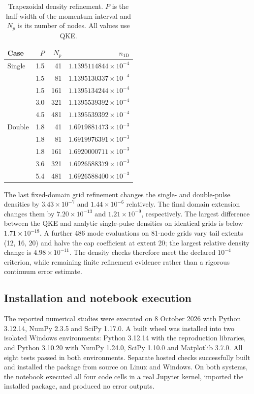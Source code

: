 \documentclass[a4paper,fleqn]{cas-dc}
\begin{document}
\begin{table}[pos=htbp]
\centering\small
\caption{Trapezoidal density refinement. $P$ is the half-width of the momentum interval and $N_p$ is its number of nodes. All values use QKE.}
\label{tab:density}
\begin{tabular}{lrrr}\toprule
Case & $P$ & $N_p$ & $n_{1\mathrm D}$\\\midrule
Single & 1.5 & 41 & $1.1395114844\times10^{-4}$\\
 & 1.5 & 81 & $1.1395130337\times10^{-4}$\\
 & 1.5 & 161 & $1.1395134244\times10^{-4}$\\
 & 3.0 & 321 & $1.1395539392\times10^{-4}$\\
 & 4.5 & 481 & $1.1395539392\times10^{-4}$\\
Double & 1.8 & 41 & $1.6919881473\times10^{-3}$\\
 & 1.8 & 81 & $1.6919976391\times10^{-3}$\\
 & 1.8 & 161 & $1.6920000711\times10^{-3}$\\
 & 3.6 & 321 & $1.6926588379\times10^{-3}$\\
 & 5.4 & 481 & $1.6926588400\times10^{-3}$\\
\bottomrule\end{tabular}
\end{table}

The last fixed-domain grid refinement changes the single- and double-pulse densities by $3.43\times10^{-7}$ and $1.44\times10^{-6}$ relatively. The final domain extension changes them by $7.20\times10^{-13}$ and $1.21\times10^{-9}$, respectively. The largest difference between the QKE and analytic single-pulse densities on identical grids is below $1.71\times10^{-18}$. A further 486 mode evaluations on 81-node grids vary tail extents (12, 16, 20) and halve the cap coefficient at extent 20; the largest relative density change is $4.98\times10^{-11}$. The density checks therefore meet the declared $10^{-4}$ criterion, while remaining finite refinement evidence rather than a rigorous continuum error estimate.

\subsection{Installation and notebook execution}

The reported numerical studies were executed on 8 October 2026 with Python 3.12.14, NumPy 2.3.5 and SciPy 1.17.0. A built wheel was installed into two isolated Windows environments: Python 3.12.14 with the reproduction libraries, and Python 3.10.20 with NumPy 1.24.0, SciPy 1.10.0 and Matplotlib 3.7.0. All eight tests passed in both environments. Separate hosted checks successfully built and installed the package from source on Linux and Windows. On both systems, the notebook executed all four code cells in a real Jupyter kernel, imported the installed package, and produced no error outputs.
\end{document}
